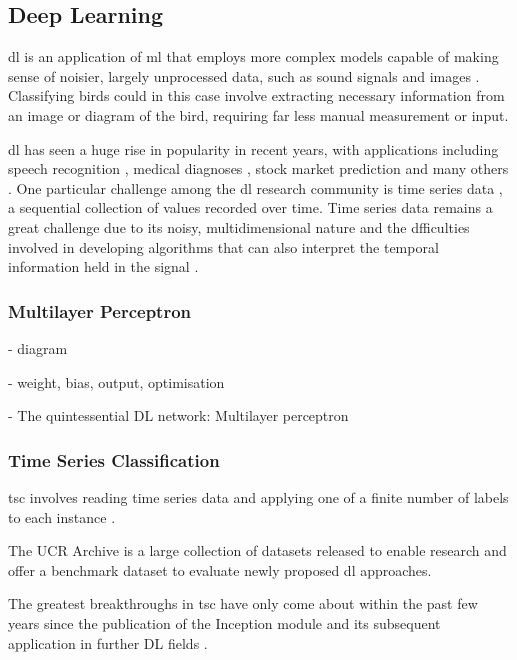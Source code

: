 \subsection{Deep Learning}
\ac{dl} is an application of \ac{ml} that employs more complex models capable of making sense of noisier, largely unprocessed data, such as sound signals and images \cite[]{goodfellow_deep_2016}. Classifying birds could in this case involve extracting necessary information from an image or diagram of the bird, requiring far less manual measurement or input.

\ac{dl} has seen a huge rise in popularity in recent years, with applications including speech recognition \cite[]{deng_machine_2013}, medical diagnoses \cite[]{lee_diagnosis_2018}, stock market prediction \cite[]{krollner_financial_2010} and many others \cite[]{kelleher_fundamentals_2015}. One particular challenge among the \ac{dl} research community is time series data \cite[]{yang_10_2006}, a sequential collection of values recorded over time. Time series data remains a great challenge due to its noisy, multidimensional nature \cite[]{kelleher_fundamentals_2015} and the dfficulties involved in developing algorithms that can also interpret the temporal information held in the signal \cite[]{bagnall_great_2017}.

\subsubsection{Multilayer Perceptron}
- diagram

- weight, bias, output, optimisation
\cite[]{kirk_thoughtful_2017}

- The quintessential DL network: Multilayer perceptron

\subsubsection{Time Series Classification}
\ac{tsc} involves reading time series data and applying one of a finite number of labels to each instance \cite{fawaz_inceptiontime_2019}.

The UCR Archive \cite{dau_ucr_2019} is a large collection of datasets released to enable research and offer a benchmark dataset to evaluate newly proposed \ac{dl} approaches.

The greatest breakthroughs in \ac{tsc} have only come about within the past few years since the publication of the Inception module \cite[]{szegedy_going_2014} and its subsequent application in further DL fields \cite{ismail_fawaz_deep_2019, fawaz_inceptiontime_2019}.

